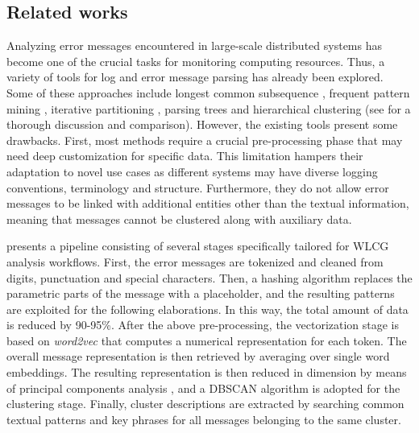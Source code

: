 \subsection{Related works} \label{sec:related_opint}


Analyzing error messages encountered in large-scale distributed systems has become one of the crucial tasks for monitoring computing resources. 
Thus, a variety of tools for log and error message parsing has already been explored. 
Some of these approaches include longest common subsequence \cite{du2016spell}, frequent pattern mining \cite{vaarandi2003slct, vaarandi2015logcluster}, iterative partitioning \cite{makanju2009iplom}, parsing trees \cite{he2017drain} and  hierarchical clustering \cite{fu2009lke} (see  for a thorough discussion and comparison).
However, the existing tools present some drawbacks. First, most methods require a crucial pre-processing phase that may need deep customization for specific data. This limitation hampers their adaptation to novel use cases as different systems may have diverse logging conventions, terminology and structure.
Furthermore, they do not allow error messages to be linked with additional entities other than the textual information, meaning that messages cannot be clustered along with auxiliary data.


 presents a pipeline consisting of several stages specifically tailored for WLCG analysis workflows. 
First, the error messages are tokenized and cleaned from digits, punctuation and special characters.
Then, a hashing algorithm replaces the parametric parts of the message with a placeholder, and the resulting patterns are exploited for the following elaborations. In this way, the total amount of data is reduced by 90-95\%.
After the above pre-processing, the vectorization stage is based on \textit{word2vec} \cite{mikolov2013word2vec} that computes a numerical representation for each token. The overall message representation is then retrieved by averaging over single word embeddings. 
The resulting representation is then reduced in dimension by means of principal components analysis \cite{wold1987pca}, and a DBSCAN \cite{ester1996dbscan} algorithm is adopted for the clustering stage.
Finally, cluster descriptions are extracted by searching common textual patterns and key phrases for all messages belonging to the same cluster.

